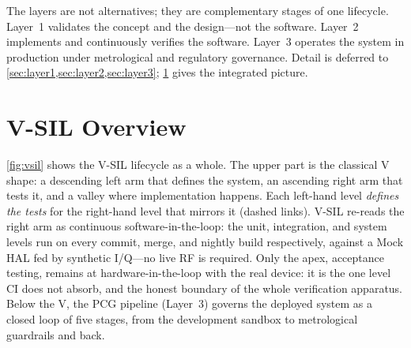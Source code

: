 \documentclass[11pt,a4paper]{article}
\begin{document}
The layers are not alternatives; they are complementary stages of one lifecycle. Layer~1
validates the concept and the design---not the software. Layer~2 implements and continuously
verifies the software. Layer~3 operates the system in production under metrological and
regulatory governance. Detail is deferred to \cref{sec:layer1,sec:layer2,sec:layer3};
\cref{sec:overview} gives the integrated picture.

\section{V-SIL Overview}
\label{sec:overview}

\cref{fig:vsil} shows the V-SIL lifecycle as a whole. The upper part is the classical V shape:
a descending left arm that defines the system, an ascending right arm that tests it, and a
valley where implementation happens. Each left-hand level \emph{defines the tests} for the
right-hand level that mirrors it (dashed links). V-SIL re-reads the right arm as continuous
software-in-the-loop: the unit, integration, and system levels run on every commit, merge, and
nightly build respectively, against a Mock HAL fed by synthetic I/Q---no live RF is required.
Only the apex, acceptance testing, remains at hardware-in-the-loop with the real device: it is
the one level CI does not absorb, and the honest boundary of the whole verification apparatus.
Below the V, the PCG pipeline (Layer~3) governs the deployed system as a closed loop of five
stages, from the development sandbox to metrological guardrails and back.
\end{document}

